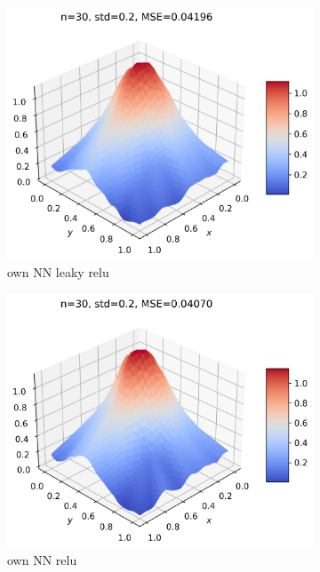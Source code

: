 \documentclass[11pt]{article}
\begin{document}
\begin{figure}[H]
\begin{subfigure}{.5\textwidth}
    \includegraphics[width=.92\textwidth]{../figures/NN_lrelu_franke.png}
    \caption{own NN leaky relu}
    \label{fig:}
  \end{subfigure}
  \begin{subfigure}{.5\textwidth}
    \centering
    \includegraphics[width=.92\textwidth]{../figures/NN_relu_franke.png}
    \caption{own NN relu}
    \label{fig:}
  \end{subfigure}
  \begin{subfigure}{.5\textwidth}
    \centering

\end{subfigure}
\end{figure}
\end{document}
